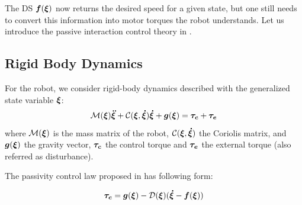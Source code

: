 \documentclass[conference]{IEEEtran}
\begin{document}
The DS $\boldsymbol{f}(\boldsymbol{\xi})$ now returns the desired speed for a given state, but one still needs to convert this information into motor torques the robot understands. Let us introduce the passive interaction control theory in \cite{kronander2015passive}.

\subsection{Rigid Body Dynamics}
For the robot, we consider rigid-body dynamics described with the generalized state variable $\boldsymbol{\xi}$:
\begin{equation}
\matd{M}(\vecs\xi)\vecs{\ddot\xi} + \matd{C}(\vecs\xi, \vecs{\dot\xi})\vecs{\dot\xi} + \vect g(\vecs\xi) = \vecs{\tau_c} + \vecs{\tau_e}
 \label{eq:robot_dynamics}
\end{equation}
where $\mathcal{M}(\boldsymbol{\xi})$ is the mass matrix of the robot, $\mathcal{C}(\boldsymbol{\xi},\boldsymbol{\dot\xi})$ the Coriolis matrix, and  $\boldsymbol{g}(\boldsymbol{\xi})$ the gravity vector, $\boldsymbol{\tau_c}$ the control torque and $\boldsymbol{\tau_e}$ the external torque (also referred as disturbance).

The passivity control law proposed in \cite{kronander2015passive} has following form:

\begin{equation}
\vecs{\tau_c} = \vect g (\vecs\xi) - \matd{D}(\vecs\xi)(\vecs{\dot\xi} -\vecs f(\vecs\xi)) 
\label{eq:control_command}
\end{equation}
\end{document}
